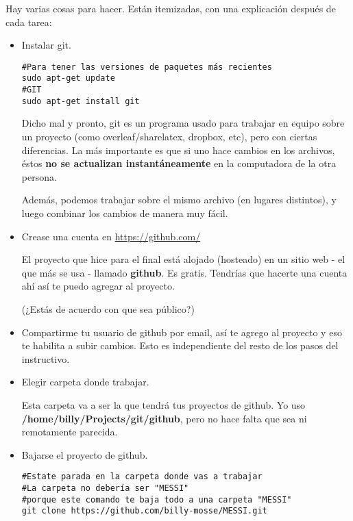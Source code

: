 \documentclass[10pt,a4paper]{report}
\begin{document}
Hay varias cosas para hacer. Están itemizadas, con una explicación después de cada tarea:


\begin{itemize}

	\item Instalar git. 
\begin{lstlisting}
#Para tener las versiones de paquetes más recientes
sudo apt-get update
#GIT
sudo apt-get install git
\end{lstlisting}

Dicho mal y pronto, git es un programa usado para trabajar en equipo sobre un proyecto (como overleaf/sharelatex, dropbox, etc), pero con ciertas diferencias. La más importante es que si uno hace cambios en los archivos, éstos \textbf{no se actualizan instantáneamente} en la computadora de la otra persona.

Además, podemos trabajar sobre el mismo archivo (en lugares distintos), y luego combinar los cambios de manera muy fácil.

\item Crease una cuenta en \url{https://github.com/}

El proyecto que hice para el final está alojado (hosteado) en un sitio web - el que más se usa - llamado \textbf{github}. Es gratis. Tendrías que hacerte una cuenta ahí así te puedo agregar al proyecto.

(¿Estás de acuerdo con que sea público?)

\item Compartirme tu usuario de github por email, así te agrego al proyecto y eso te habilita a subir cambios. Esto es independiente del resto de los pasos del instructivo.

\item Elegir carpeta donde trabajar.

Esta carpeta va a ser la que tendrá tus proyectos de github. Yo uso \textbf{/home/billy/Projects/git/github}, pero no hace falta que sea ni remotamente parecida.

\item Bajarse el proyecto de github.

\begin{lstlisting}
#Estate parada en la carpeta donde vas a trabajar
#La carpeta no debería ser "MESSI"
#porque este comando te baja todo a una carpeta "MESSI"
git clone https://github.com/billy-mosse/MESSI.git
\end{lstlisting}


\end{itemize}
\end{document}
